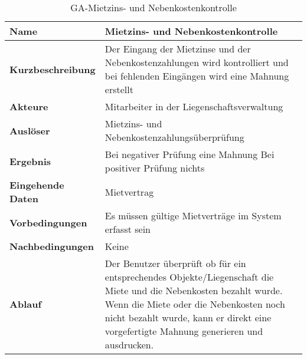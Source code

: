 \begin{table}[H]
  \centering
  \settowidth{}
  \setlength\extrarowheight{2pt}
  \begin{tabulary}{1.0\textwidth}{|a|m{12cm}|}
    \hline
    \textbf{Name}&Mietzins- und Nebenkostenkontrolle\\
    \hline 
    \textbf{Kurzbeschreibung} & Der Eingang der Mietzinse und der Nebenkostenzahlungen wird kontrolliert und bei fehlenden Eingängen wird eine Mahnung erstellt\\
    \hline
    \textbf{Akteure} & Mitarbeiter in der Liegenschaftsverwaltung\\
    \hline
    \textbf{Auslöser} & Mietzins- und Nebenkostenzahlungsüberprüfung\\
    \hline
    \textbf{Ergebnis} & Bei negativer Prüfung eine Mahnung\newline 
    Bei positiver Prüfung nichts\\
    \hline
    \textbf{Eingehende Daten} & Mietvertrag\\
    \hline
    \textbf{Vorbedingungen} & Es müssen gültige Mietverträge im System erfasst sein \\
    \hline
    \textbf{Nachbedingungen} & Keine \\
    \hline
    \textbf{Ablauf} & Der Benutzer überprüft ob für ein entsprechendes Objekte/Liegenschaft die Miete und die Nebenkosten bezahlt wurde. Wenn die Miete oder die Nebenkosten noch nicht bezahlt wurde, kann er direkt eine vorgefertigte Mahnung generieren und ausdrucken.\\
    \hline
  \end{tabulary}
  \caption{GA-Mietzins- und Nebenkostenkontrolle}
\end{table}

